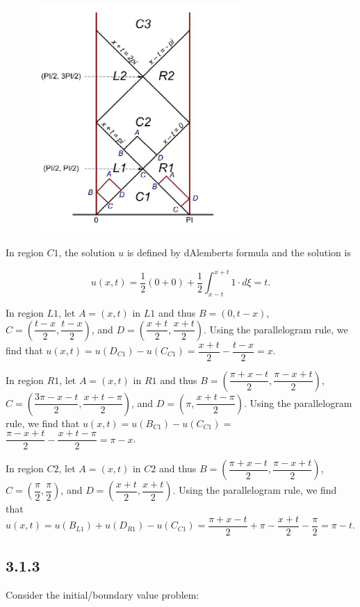 \documentclass{article}
\begin{document}
\begin{figure}[h]
 \centering
  \includegraphics[width=0.7\textwidth]{Region.png}
 \end{figure}

\newpage
In region $C1$, the solution $u$ is defined by d\textsc{}Alembert\textsc{}s formula and the solution is

$$u(x,t)=\frac{1}{2}(0+0)+\frac{1}{2}\int_{x-t}^{x+t}1\cdot d\xi= t.$$

In region $L1$, let $A=(x,t)$ in $L1$ and thus $B=(0,t-x)$, $C=(\dfrac{t-x}{2}, \dfrac{t-x}{2})$, and $D=(\dfrac{x+t}{2}, \dfrac{x+t}{2})$. Using the parallelogram rule, we find that $u(x,t)=u(D_{C1})-u(C_{C1})=\dfrac{x+t}{2} - \dfrac{t-x}{2}=x$.

In region $R1$, let $A=(x,t)$ in $R1$ and thus $B=(\dfrac{\pi + x -t}{2},\dfrac{\pi - x +t}{2})$, $C=(\dfrac{3\pi -x -t}{2}, \dfrac{x+t - \pi}{2})$, and $D=(\pi, \dfrac{x+t-\pi}{2})$. Using the parallelogram rule, we find that $u(x,t)=u(B_{C1})-u(C_{C1}) =$ $\dfrac{\pi-x+t}{2} - \dfrac{x+t-\pi}{2}=\pi - x$.

In region $C2$, let $A=(x,t)$ in $C2$ and thus $B=(\dfrac{\pi + x -t}{2},\dfrac{\pi - x +t}{2})$, $C=(\dfrac{\pi}{2}, \dfrac{\pi}{2})$, and $D=(\dfrac{x+t}{2}, \dfrac{x+t}{2})$. Using the parallelogram rule, we find that $u(x,t)=u(B_{L1})+u(D_{R1})-u(C_{C1})=\dfrac{\pi + x -t}{2} + \pi - \dfrac{x+t}{2} -\dfrac{\pi}{2}=\pi - t$.

\subsection{\textbf{3.1.3}} Consider the initial/boundary value problem:
\end{document}

